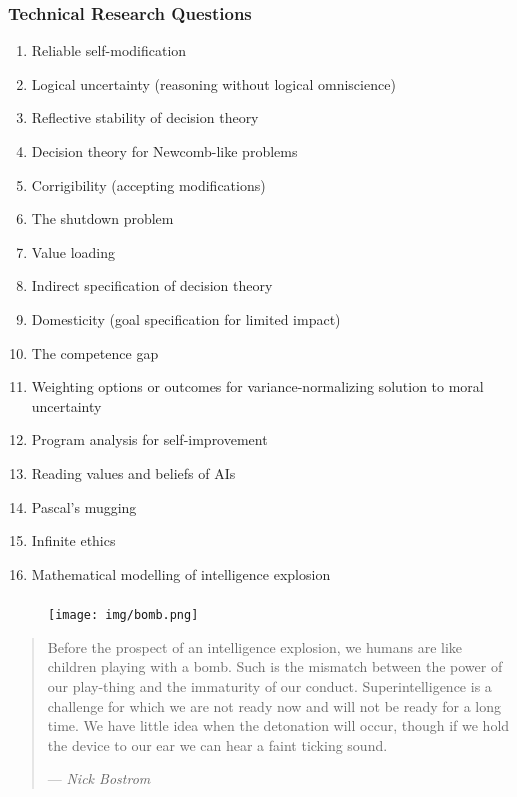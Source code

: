 \documentclass[UTF8,11pt,colorlinks,compress,openany]{beamer}%
\begin{document}
\begin{frame}\frametitle{Technical Research Questions}
\begin{enumerate}
	\item Reliable self-modification
	\item Logical uncertainty (reasoning without logical omniscience)
	\item Reflective stability of decision theory
	\item Decision theory for Newcomb-like problems
	\item Corrigibility (accepting modifications)
	\item The shutdown problem
	\item Value loading
	\item Indirect specification of decision theory
	\item Domesticity (goal specification for limited impact)
	\item The competence gap
	\item Weighting options or outcomes for variance-normalizing solution to moral uncertainty
	\item Program analysis for self-improvement
	\item Reading values and beliefs of AIs
	\item Pascal's mugging
	\item Infinite ethics
	\item Mathematical modelling of intelligence explosion
\end{enumerate}
\end{frame}

\begin{frame}\frametitle{}
\begin{figure}[H]
\texttt{[image: img/bomb.png]}	
\end{figure}
\begin{quote}
Before the prospect of an intelligence explosion, we humans are like children playing with a bomb.
Such is the mismatch between the power of our
play-thing and the immaturity of our conduct.
Superintelligence is a challenge for which we are not ready now and will not be ready for a long time. We have little idea when the detonation will occur, though if we hold the device to our ear we can hear a faint ticking sound.\par\hfill --- \textsl{Nick Bostrom}
\end{quote}
\end{frame}


\end{document}
